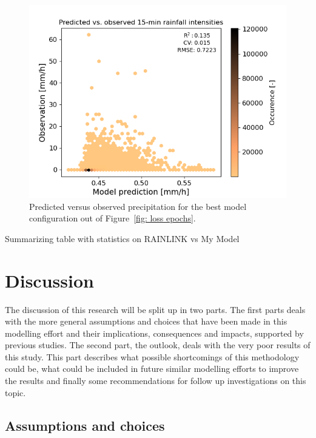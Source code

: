 \documentclass[twocolumn, 10pt, a4paper]{memoir}
\begin{document}
	
	\begin{figure}
		\includegraphics[width=\columnwidth]{scatter_final}
		\caption{Predicted versus observed precipitation for the best model configuration out of Figure~\ref{fig: loss epochs}.}
		\label{fig: scatter statistics}
	\end{figure}
	Summarizing table with statistics on RAINLINK vs My Model
	

	
	\chapter{Discussion} \label{ch: discussion}
	The discussion of this research will be split up in two parts. The first parts deals with the more general assumptions and choices that have been made in this modelling effort and their implications, consequences and impacts, supported by previous studies. The second part, the outlook, deals with the very poor results of this study. This part describes what possible shortcomings of this methodology could be, what could be included in future similar modelling efforts to improve the results and finally some recommendations for follow up investigations on this topic. 
	\section{Assumptions and choices}
\end{document}
